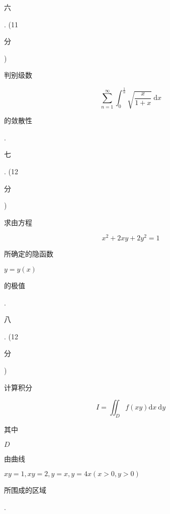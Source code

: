 \documentclass[10pt]{article}
\begin{document}
\begin{CJK}{UTF8}{mj}六\end{CJK}. (11 \begin{CJK}{UTF8}{mj}分\end{CJK}) \begin{CJK}{UTF8}{mj}判别级数\end{CJK}
$$
\sum_{n=1}^{\infty} \int_{0}^{\frac{1}{n}} \sqrt{\frac{x}{1+x}} \mathrm{~d} x
$$
\begin{CJK}{UTF8}{mj}的敛散性\end{CJK}.

\begin{CJK}{UTF8}{mj}七\end{CJK}. (12 \begin{CJK}{UTF8}{mj}分\end{CJK}) \begin{CJK}{UTF8}{mj}求由方程\end{CJK}
$$
x^{2}+2 x y+2 y^{2}=1
$$
\begin{CJK}{UTF8}{mj}所确定的隐函数\end{CJK} $y=y(x)$ \begin{CJK}{UTF8}{mj}的极值\end{CJK}.

\begin{CJK}{UTF8}{mj}八\end{CJK}. (12 \begin{CJK}{UTF8}{mj}分\end{CJK}) \begin{CJK}{UTF8}{mj}计算积分\end{CJK}
$$
I=\iint_{D} f(x y) \mathrm{d} x \mathrm{~d} y
$$
\begin{CJK}{UTF8}{mj}其中\end{CJK} $D$ \begin{CJK}{UTF8}{mj}由曲线\end{CJK} $x y=1, x y=2, y=x, y=4 x(x>0, y>0)$ \begin{CJK}{UTF8}{mj}所围成的区域\end{CJK}.
\end{document}
